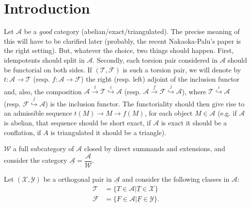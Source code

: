 \clearpage

\section{Introduction}

Let $\mathcal{A}$ be a \emph{good} category
(abelian/exact/triangulated). The precise meaning of this will have to
be clarified later (probably, the recent Nakaoka-Palu's paper is the
right setting). But, whatever the choice, two things should happen.
First, idempotents should split in $\mathcal{A}$. Secondly,  each
torsion pair considered  in $\mathcal{A}$ should be functorial on both
sides. If $(\mathcal{T},\mathcal{F})$ is such a torsion pair, we will
denote by $t:\mathcal{A}\longrightarrow\mathcal{T}$ (resp.
$f:\mathcal{A}\longrightarrow\mathcal{F}$) the right (resp. left)
adjoint of the inclusion functor and, also, the composition
$\mathcal{A}\stackrel{t}{\longrightarrow}\mathcal{T}\stackrel{i}{\hookrightarrow}\mathcal{A}$
(resp.
$\mathcal{A}\stackrel{f}{\longrightarrow}\mathcal{F}\stackrel{j}{\hookrightarrow}\mathcal{A}$),
where $\mathcal{T}\stackrel{i}{\hookrightarrow}\mathcal{A}$ (resp.
$\mathcal{F}\stackrel{j}{\hookrightarrow}\mathcal{A}$) is the inclusion
functor. The functoriality should then give rise to an admissible
sequence $t(M)\longrightarrow M\longrightarrow f(M)$, for each object
$M\in\mathcal{A}$ (e.g. if $\mathcal{A}$ is abelian, that sequence
should be short exact, if $\mathcal{A}$ is exact it should be a
conflation, if $A$ is triangulated it should be a triangle).



$\mathcal{W}$ a full subcategory of $\mathcal{A}$ closed by direct
summands and extensions, and consider the category
$\underline{\mathcal{A}}=\dfrac{\mathcal{A}}{\mathcal{W}}$.

Let $(\mathcal{X},\mathcal{Y})$ be a orthogonal pair in
$\underline{\mathcal{A}}$ and consider the following classes in
$\mathcal{A}$:
\begin{align*}
  \mathcal{T} &= \{ T\in\mathcal{A} | \underline{T}\in\mathcal{X} \} \\
  \mathcal{F} &= \{ F\in\mathcal{A} | \underline{F}\in\mathcal{Y} \}.
\end{align*}

\begin{lemma}
  [empty]
\end{lemma}

